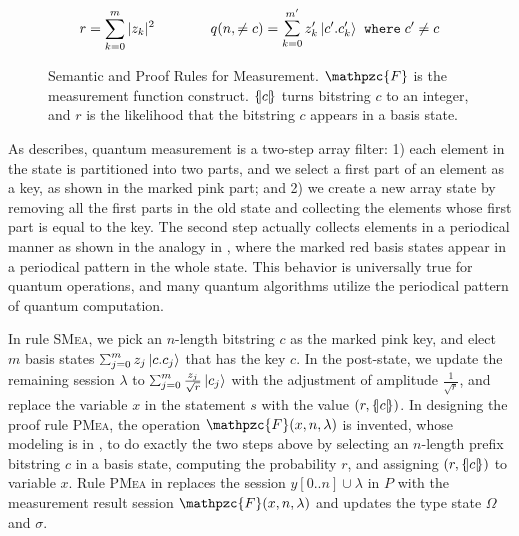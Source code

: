 \begin{figure}[t]
{{\begin{minipage}[t]{\textwidth}
\begin{mathpar}
  \end{mathpar}

  \label{fig:qafny-mea-rules}
\end{minipage}
}
}
{\footnotesize
\[r= \sum_{k=0}^{m} \slen{z_k}^2
\qquad\qquad
q(n,\neq c) = \schk{m'}{z'_k}{c'.c'_{k}} \;\;\texttt{where}\;c'\neq c\]
}
\caption{Semantic and Proof Rules for Measurement. $\mathpzc{F}$ is the measurement function construct. $\tov{c}$ turns bitstring $c$ to an integer, and $r$ is the likelihood that the bitstring $c$ appears in a basis state. }
\label{fig:exp-proofsystem-4}
\end{figure}

\label{sec:measurement}
As  describes, quantum measurement is a two-step array filter: 1) each element in the state is partitioned into two parts, and we select a first part of an element as a key, as shown in the marked pink part; and 2) we create a new array state by removing all the first parts in the old state and collecting the elements whose first part is equal to the key.
The second step actually collects elements in a periodical manner as shown in the analogy in , where the marked red basis states appear in a periodical pattern in the whole state. This behavior is universally true for quantum operations, and many quantum algorithms utilize the periodical pattern of quantum computation.

In rule \textsc{SMea}, we pick an $n$-length bitstring $c$ as the marked pink key, and elect $m$ basis states $\sch{m}{z_j}{c.c_{j}}$ that has the key $c$. In the post-state, we update the remaining session $\lambda$ to $\sch{m}{\frac{z_j}{\sqrt{r}}}{c_{j}}$ with the adjustment of amplitude $\frac{1}{\sqrt{r}}$, and replace the variable $x$ in the statement $s$ with the value $(r,\tov{c})$.
In designing the proof rule \textsc{PMea}, the operation $\mathpzc{F}(x,n,\lambda)$ is invented,
whose modeling is in , to do exactly the two steps above by selecting an $n$-length prefix bitstring $c$ in a basis state, computing the probability $r$, and assigning $(r,\tov{c})$ to variable $x$.
Rule \textsc{PMea} in  replaces the session $y[0..n]\cup \lambda$ in $P$ with the measurement result session $\mathpzc{F}(x,n,\lambda)$ and updates the type state $\Omega$ and $\sigma$. 


